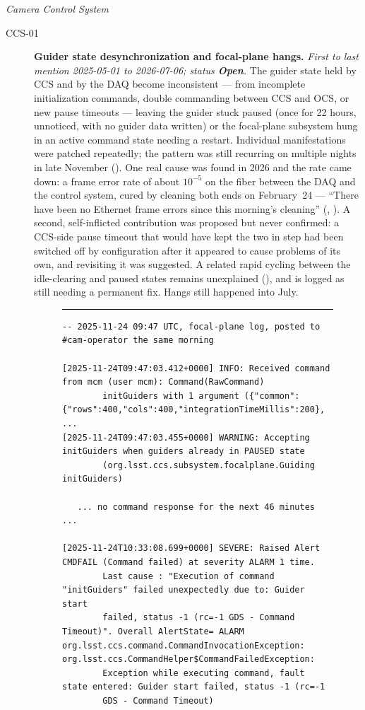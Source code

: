 \noindent\textit{Camera Control System}
\begin{description}
\item[CCS-01]\label{iss:CCS-01} \textbf{Guider state desynchronization and focal-plane hangs.}
  \emph{First to last mention 2025-05-01 to 2026-07-06; status \textcolor{stopn}{\textbf{Open}}.}
  The guider state held by CCS and by the DAQ become inconsistent --- from incomplete initialization commands, double commanding between CCS and OCS, or new pause timeouts --- leaving the guider stuck paused (once for 22 hours, unnoticed, with no guider data written) or the focal-plane subsystem hung in an active command state needing a restart.  Individual manifestations were patched repeatedly; the pattern was still recurring on multiple nights in late November ().  One real cause was found in 2026 and the rate came down: a frame error rate of about $10^{-5}$ on the fiber between the DAQ and the control system, cured by cleaning both ends on February~24 --- ``There have been no Ethernet frame errors since this morning's cleaning'' (, ).  A second, self-inflicted contribution was proposed but never confirmed: a CCS-side pause timeout that would have kept the two in step had been switched off by configuration after it appeared to cause problems of its own, and revisiting it was suggested.  A related rapid cycling between the idle-clearing and paused states remains unexplained (), and  is logged as still needing a permanent fix.  Hangs still happened into July.

\begin{figure}[H]
\centering
\begin{minipage}{\textwidth}
\hrule\vspace{4pt}
\begingroup\scriptsize
\begin{verbatim}
-- 2025-11-24 09:47 UTC, focal-plane log, posted to #cam-operator the same morning

[2025-11-24T09:47:03.412+0000] INFO: Received command from mcm (user mcm): Command(RawCommand)
        initGuiders with 1 argument ({"common":{"rows":400,"cols":400,"integrationTimeMillis":200}, ...
[2025-11-24T09:47:03.455+0000] WARNING: Accepting initGuiders when guiders already in PAUSED state
        (org.lsst.ccs.subsystem.focalplane.Guiding initGuiders)

   ... no command response for the next 46 minutes ...

[2025-11-24T10:33:08.699+0000] SEVERE: Raised Alert CMDFAIL (Command failed) at severity ALARM 1 time.
        Last cause : "Execution of command "initGuiders" failed unexpectedly due to: Guider start
        failed, status -1 (rc=-1 GDS - Command Timeout)". Overall AlertState= ALARM
org.lsst.ccs.command.CommandInvocationException: org.lsst.ccs.CommandHelper$CommandFailedException:
        Exception while executing command, fault state entered: Guider start failed, status -1 (rc=-1
        GDS - Command Timeout)


\end{verbatim}
\end{minipage}
\end{figure}
\end{description}
